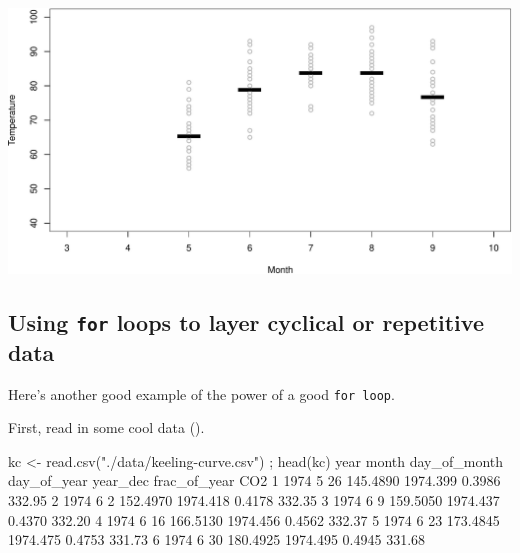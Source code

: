 \documentclass[
]{book}
\newenvironment{Shaded}{\begin{snugshade}}{\end{snugshade}}
\newcommand{\DecValTok}[1]{\textcolor[rgb]{0.00,0.00,0.81}{#1}}
\newcommand{\FloatTok}[1]{\textcolor[rgb]{0.00,0.00,0.81}{#1}}
\newcommand{\FunctionTok}[1]{\textcolor[rgb]{0.00,0.00,0.00}{#1}}
\newcommand{\NormalTok}[1]{#1}
\newcommand{\OtherTok}[1]{\textcolor[rgb]{0.56,0.35,0.01}{#1}}
\newcommand{\StringTok}[1]{\textcolor[rgb]{0.31,0.60,0.02}{#1}}
\begin{document}
\includegraphics{figures/unnamed-chunk-309-1.pdf}

\hypertarget{using-for-loops-to-layer-cyclical-or-repetitive-data}{%
\subsection*{\texorpdfstring{Using \texttt{for} loops to layer cyclical or repetitive data}{Using for loops to layer cyclical or repetitive data}}\label{using-for-loops-to-layer-cyclical-or-repetitive-data}}

Here's another good example of the power of a good \texttt{for\ loop}.

First, read in some cool data ().

\begin{Shaded}
\begin{Highlighting}[]
\NormalTok{kc }\OtherTok{\textless{}{-}} \FunctionTok{read.csv}\NormalTok{(}\StringTok{"./data/keeling{-}curve.csv"}\NormalTok{) ; }\FunctionTok{head}\NormalTok{(kc)}
\NormalTok{  year month day\_of\_month day\_of\_year year\_dec frac\_of\_year    CO2}
\DecValTok{1} \DecValTok{1974}     \DecValTok{5}           \DecValTok{26}    \FloatTok{145.4890} \FloatTok{1974.399}       \FloatTok{0.3986} \FloatTok{332.95}
\DecValTok{2} \DecValTok{1974}     \DecValTok{6}            \DecValTok{2}    \FloatTok{152.4970} \FloatTok{1974.418}       \FloatTok{0.4178} \FloatTok{332.35}
\DecValTok{3} \DecValTok{1974}     \DecValTok{6}            \DecValTok{9}    \FloatTok{159.5050} \FloatTok{1974.437}       \FloatTok{0.4370} \FloatTok{332.20}
\DecValTok{4} \DecValTok{1974}     \DecValTok{6}           \DecValTok{16}    \FloatTok{166.5130} \FloatTok{1974.456}       \FloatTok{0.4562} \FloatTok{332.37}
\DecValTok{5} \DecValTok{1974}     \DecValTok{6}           \DecValTok{23}    \FloatTok{173.4845} \FloatTok{1974.475}       \FloatTok{0.4753} \FloatTok{331.73}
\DecValTok{6} \DecValTok{1974}     \DecValTok{6}           \DecValTok{30}    \FloatTok{180.4925} \FloatTok{1974.495}       \FloatTok{0.4945} \FloatTok{331.68}
\end{Highlighting}
\end{Shaded}
\end{document}
